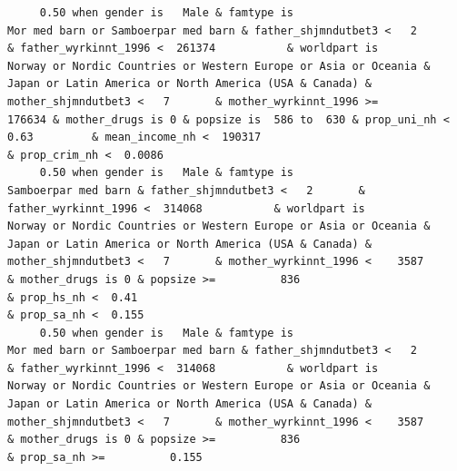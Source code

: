 \documentclass[
  letterpaper,
  DIV=11,
  numbers=noendperiod]{scrreprt}
\begin{document}
\begin{verbatim}
     0.50 when gender is   Male & famtype is                              Mor med barn or Samboerpar med barn & father_shjmndutbet3 <   2       & father_wyrkinnt_1996 <  261374           & worldpart is            Norway or Nordic Countries or Western Europe or Asia or Oceania & Japan or Latin America or North America (USA & Canada) & mother_shjmndutbet3 <   7       & mother_wyrkinnt_1996 >=           176634 & mother_drugs is 0 & popsize is  586 to  630 & prop_uni_nh <  0.63         & mean_income_nh <  190317                                        & prop_crim_nh <  0.0086                                                                                                                                                                                                                                                                                      
     0.50 when gender is   Male & famtype is                                              Samboerpar med barn & father_shjmndutbet3 <   2       & father_wyrkinnt_1996 <  314068           & worldpart is            Norway or Nordic Countries or Western Europe or Asia or Oceania & Japan or Latin America or North America (USA & Canada) & mother_shjmndutbet3 <   7       & mother_wyrkinnt_1996 <    3587           & mother_drugs is 0 & popsize >=          836                                                                    & prop_hs_nh <  0.41                                                                                                                                                   & prop_sa_nh <  0.155                                                                                                                                               
     0.50 when gender is   Male & famtype is                              Mor med barn or Samboerpar med barn & father_shjmndutbet3 <   2       & father_wyrkinnt_1996 <  314068           & worldpart is            Norway or Nordic Countries or Western Europe or Asia or Oceania & Japan or Latin America or North America (USA & Canada) & mother_shjmndutbet3 <   7       & mother_wyrkinnt_1996 <    3587           & mother_drugs is 0 & popsize >=          836                                                                                                                                                                                                                                           & prop_sa_nh >=          0.155                                                                                                                                      

\end{verbatim}
\end{document}
